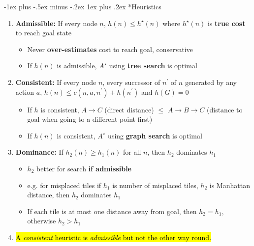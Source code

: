 \documentclass[10pt,landscape]{article}
\makeatletter
\newcommand{\subsubsubsection}{\@startsection{subsubsection}{3}{0mm}%
                                {-1ex plus -.5ex minus -.2ex}%
                                {1ex plus .2ex}%
                                {\normalfont\scriptsize\bfseries}}
\makeatother
\begin{document}
\begin{multicols*}{3}
\subsubsubsection*{Heuristics}
\begin{enumerate}[topsep=0pt,noitemsep,wide=0pt, leftmargin=\dimexpr\labelwidth + 2\labelsep\relax]
  \item \textbf{Admissible:} If every node $n$, $h(n) \leq h^{\star}(n)$ where $h^{\star}(n)$ is \textbf{true cost} to reach goal state
  \begin{itemize}[topsep=0pt,noitemsep,wide=0pt, leftmargin=\dimexpr{} + 2\relax]
    \item Never \textbf{over-estimates} cost to reach goal, conservative
    \item If $h(n)$ is admissible, $A^{\star}$ using \textbf{tree search} is optimal
  \end{itemize}
  \item \textbf{Consistent:} If every node $n$, every successor of $n^{'}$ of $n$ generated by any action $a$, $h(n) \leq c(n,a,n^{'}) + h(n^{'})$ and $h(G) = 0$
  \begin{itemize}[topsep=0pt,noitemsep,wide=0pt, leftmargin=\dimexpr{} + 2\relax]
    \item If $h$ is consistent, $A \rightarrow C$ (direct distance) $\leq$ $A \rightarrow B \rightarrow C$ (distance to goal when going to a different point first)
    \item If $h(n)$ is consistent, $A^{\star}$ using \textbf{graph search} is optimal
  \end{itemize}
  \item \textbf{Dominance:} If $h_2(n) \geq h_1(n)$ for all $n$, then $h_2$ dominates $h_1$
  \begin{itemize}[topsep=0pt,noitemsep,wide=0pt, leftmargin=\dimexpr{} + 2\relax]
    \item $h_2$ better for search \textbf{if admissible}
    \item e.g. for misplaced tiles if $h_1$ is number of misplaced tiles, $h_2$ is Manhattan distance, then $h_2$ dominates $h_1$
    \item If each tile is at most one distance away from goal, then $h_2 = h_1$, otherwise $h_2 > h_1$ 
  \end{itemize}
  \item \hl{A \textit{consistent} heuristic is \textit{admissible} but not the other way round.}
\end{enumerate}


\end{multicols*}
\end{document}

